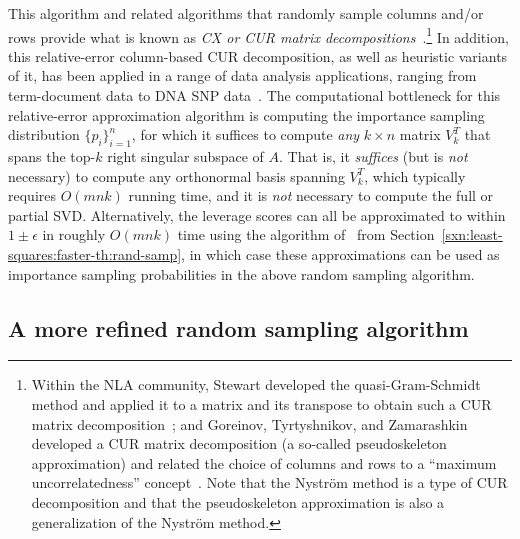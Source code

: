 \documentclass[twoside]{article}
\begin{document}
This algorithm and related algorithms that randomly sample columns and/or 
rows provide what is known as \emph{CX or CUR matrix 
decompositions}~\cite{dkm_matrix3,DMM08_CURtheory_JRNL,CUR_PNAS}.\footnote{Within the NLA community, Stewart developed the quasi-Gram-Schmidt 
method and applied it to a matrix and its transpose to obtain such a CUR 
matrix decomposition~\cite{Ste99,BPS04_TR}; and Goreinov, Tyrtyshnikov, and 
Zamarashkin developed a CUR matrix decomposition (a so-called pseudoskeleton 
approximation) and related the choice of columns and rows to a ``maximum 
uncorrelatedness'' concept~\cite{GTZ97,GT01}.  Note that the Nystr\"{o}m 
method is a type of CUR decomposition and that the pseudoskeleton
approximation is also a generalization of the Nystr\"{o}m method.}
In addition, this relative-error column-based CUR decomposition, as well as 
heuristic variants of it, has been applied in a range of data analysis 
applications, ranging from term-document data to DNA SNP 
data~\cite{CUR_PNAS,Paschou07a,Paschou07b}.
The computational bottleneck for this relative-error approximation algorithm 
is computing the importance sampling distribution $\{p_i\}_{i=1}^{n}$, for 
which it suffices to compute \emph{any} $k \times n$ matrix $V_k^T$ that 
spans the top-$k$ right singular subspace of $A$.
That is, it \emph{suffices} (but is \emph{not} necessary) to compute any 
orthonormal basis spanning $V_k^T$, which typically requires $O(mnk)$ 
running time, and it is \emph{not} necessary to compute the full or partial 
SVD.
Alternatively, the leverage scores can all be 
approximated to within $1\pm\epsilon$ in roughly $O(mn k)$ time using 
the algorithm of~\cite{DMMW11_TR} from 
Section~\ref{sxn:least-squares:faster-th:rand-samp}, in which case these 
approximations can be used as importance sampling probabilities in the 
above random sampling algorithm.


\subsection{A more refined random sampling algorithm}
\label{sxn:low-rank:exactlyk}
\end{document}
